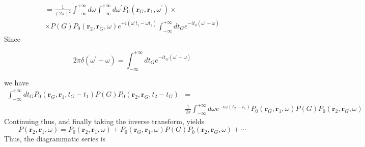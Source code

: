 $$\begin{array}{c}
=\frac{1}{(2 \pi)^{2}} \int_{-\infty}^{+\infty} d \omega \int_{-\infty}^{+\infty} d \omega^{\prime} P_{0}\left(\mathbf{r}_{G}, \mathbf{r}_{1}, \omega^{\prime}\right) \times \\
\times P(G) P_{0}\left(\mathbf{r}_{2}, \mathbf{r}_{G}, \omega\right) e^{+i\left(\omega^{\prime} t_{1}-\omega t_{2}\right)} \int_{-\infty}^{+\infty} d t_{G} e^{-i t_{0}\left(\omega^{\prime}-\omega\right)}
\end{array}$$
Since
\begin{imp}
\begin{equation}
2 \pi \delta\left(\omega^{\prime}-\omega\right)=\int_{-\infty}^{+\infty} d t_{G} e^{-i t_{G}\left(\omega^{\prime}-\omega\right)}\end{equation}
\end{imp}
we have
\begin{equation}
\begin{aligned}
\int_{-\infty}^{+\infty} d t_{G} P_{0}\left(\mathbf{r}_{G}, \mathbf{r}_{1}, t_{G}-t_{1}\right) P(G) P_{0}\left(\mathbf{r}_{2}, \mathbf{r}_{G}, t_{2}-t_{G}\right)&=\\
&\frac{1}{2 \pi} \int_{-\infty}^{+\infty} d \omega e^{-i \omega\left(t_{2}-t_{1}\right)} P_{0}\left(\mathbf{r}_{G}, \mathbf{r}_{1}, \omega\right) P(G) P_{0}\left(\mathbf{r}_{2}, \mathbf{r}_{G}, \omega\right)
\end{aligned}
\end{equation}
Continuing thus, and finally taking the inverse transform, yields
\begin{equation}P\left(\mathbf{r}_{2}, \mathbf{r}_{1}, \omega\right)=P_{0}\left(\mathbf{r}_{2}, \mathbf{r}_{1}, \omega\right)+P_{0}\left(\mathbf{r}_{G}, \mathbf{r}_{1}, \omega\right) P(G) P_{0}\left(\mathbf{r}_{2}, \mathbf{r}_{G}, \omega\right)+\cdots\end{equation}
Thus, the diagrammatic series is
